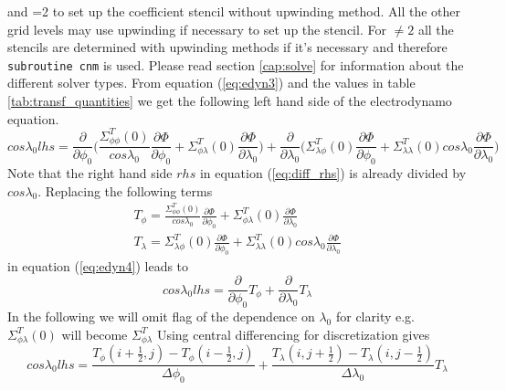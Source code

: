and =2 to set
up the coefficient stencil without upwinding method. All the other grid
levels may use upwinding if necessary to set up the stencil. For 
 $\neq 2$ all the stencils are determined with upwinding methods
if it's necessary and therefore  \texttt{subroutine cnm} is used.
Please read section \ref{cap:solve} for information about the different
solver types.
%
From equation (\ref{eq:edyn3}) and the values in table \ref{tab:transf_quantities}
we get the following left hand side of the electrodynamo equation.
%
\begin{equation}
 cos \lambda_0 lhs=  \frac{\partial}{\partial \phi_0} 
    \bigl( \frac{\Sigma_{\phi \phi}^T(0)}{cos
   \lambda_0} \frac{\partial \Phi}{\partial \phi_0} + 
   \Sigma_{\phi \lambda}^T(0) \frac{\partial \Phi}{\partial \lambda_0} \bigr) +
   \frac{\partial}
   {\partial  \lambda_0 } \bigl( \Sigma_{\lambda \phi}^T(0)
    \frac{\partial \Phi}{\partial \phi_0} + 
   \Sigma_{\lambda \lambda}^T(0) cos \lambda_0 
   \frac{\partial \Phi}{\partial \lambda_0} \bigr)
    \label{eq:edyn4}
\end{equation}
%
Note that the right hand side $rhs$ in equation (\ref{eq:diff_rhs}) is already divided
by $cos \lambda_0$. Replacing 
the following terms
%
\begin{align}
 T_{\phi}=  \frac{\Sigma_{\phi \phi}^T(0)}{cos
   \lambda_0} \frac{\partial \Phi}{\partial \phi_0} + 
   \Sigma_{\phi \lambda}^T(0) \frac{\partial \Phi}{\partial \lambda_0} \\
 T_{\lambda}= \Sigma_{\lambda \phi}^T(0)
    \frac{\partial \Phi}{\partial \phi_0} + 
   \Sigma_{\lambda \lambda}^T(0) cos \lambda_0 
   \frac{\partial \Phi}{\partial \lambda_0} 
\end{align}
%
in equation (\ref{eq:edyn4}) leads to
%
\begin{equation}
 cos \lambda_0 lhs=  \frac{\partial}{\partial \phi_0} T_{\phi}  +
   \frac{\partial}{\partial  \lambda_0 } T_{\lambda}  \label{eq:edyn5}
\end{equation}
%
In the following we will omit flag of the dependence on $\lambda_0$ for
clarity e.g.
$\Sigma_{\phi \lambda}^T(0)$ will become $\Sigma_{\phi \lambda}^T$
Using central differencing for discretization gives
%
\begin{equation}
 cos \lambda_0 lhs=  \frac{T_{\phi}(i+\frac{1}{2},j)-T_{\phi}(i-\frac{1}{2},j)}
 {\Delta \phi_0}   +
   \frac{ T_{\lambda}(i,j+\frac{1}{2})- T_{\lambda}(i,j-\frac{1}{2})}
   {\Delta  \lambda_0 } T_{\lambda}\label{eq:edyn6}
\end{equation}
